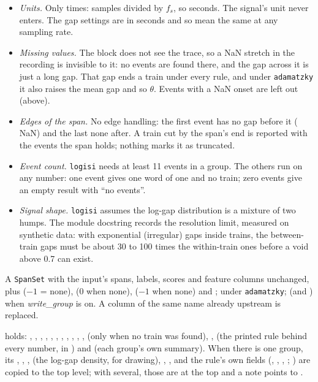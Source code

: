 \begin{itemize}
\item \emph{Units.} Only times: samples divided by $f_s$, so seconds. The signal's unit
  never enters. The gap settings are in seconds and so mean the same at any sampling rate.
\item \emph{Missing values.} The block does not see the trace, so a NaN stretch in the
  recording is invisible to it: no events are found there, and the gap across it is just a
  long gap. That gap ends a train under every rule, and under \texttt{adamatzky} it also
  raises the mean gap and so $\theta$. Events with a NaN onset are left out (above).
\item \emph{Edges of the span.} No edge handling: the first event has no gap before it
  ( NaN) and the last none after. A train cut by the span's end is
  reported with the events the span holds; nothing marks it as truncated.
\item \emph{Event count.} \texttt{logisi} needs at least 11 events in a group. The others run
  on any number: one event gives one word of one and no train; zero events give an empty
  result with ``no events''.
\item \emph{Signal shape.} \texttt{logisi} assumes the log-gap distribution is a mixture of
  two humps. The module docstring records the resolution limit, measured on synthetic data:
  with exponential (irregular) gaps inside trains, the between-train gaps must be about 30
  to 100 times the within-train ones before a void above 0.7 can exist.
\end{itemize}

A \texttt{SpanSet} with the input's spans, labels, scores and feature columns unchanged, plus
 ($-1$ = none),  (0 when none), 
($-1$ when none) and ;  under \texttt{adamatzky}; 
(and ) when \emph{write\_group} is on. A column of the same name already
upstream is replaced.

 holds: , , , ,
, , , ,
, , ,
 (only when no train was found), ,  (the
printed rule behind every number,  in ) and  (each
group's own summary). When there is one group, its , ,
,  (the log-gap density, for drawing), ,
, and the rule's own fields (, ,
, ; ) are copied to the top
level; with several, those are  at the top and a note points to .

